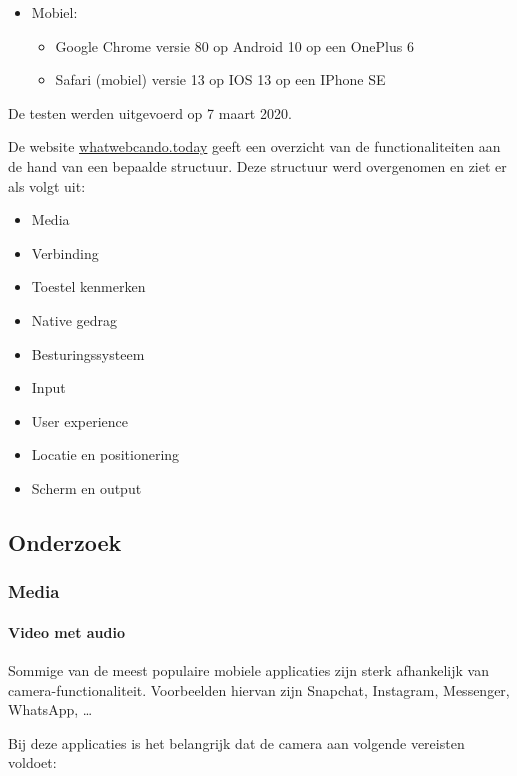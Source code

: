 \begin{itemize}
   \item Mobiel:
   \begin{itemize}
     \item Google Chrome versie 80 op Android 10 op een OnePlus 6
     \item Safari (mobiel) versie 13 op IOS 13 op een IPhone SE 
     
   \end{itemize}
\end{itemize}

De testen werden uitgevoerd op 7 maart 2020.

De website \href{https://whatwebcando.today/}{whatwebcando.today} geeft een overzicht van de functionaliteiten aan de hand van een bepaalde structuur. Deze structuur werd overgenomen en ziet er als volgt uit:
   \begin{itemize}
     \item	Media
     \item	Verbinding
     \item	Toestel kenmerken
     \item	Native gedrag
     \item	Besturingssysteem
     \item	Input
     \item	User experience
     \item	Locatie en positionering
     \item	Scherm en output
   \end{itemize}

\subsection{Onderzoek}

\subsubsection{Media}

\paragraph{Video met audio }

Sommige van de meest populaire mobiele applicaties zijn sterk afhankelijk van camera-functionaliteit. Voorbeelden hiervan zijn Snapchat, Instagram, Messenger, WhatsApp, … 

Bij deze applicaties is het belangrijk dat de camera aan volgende vereisten voldoet:

